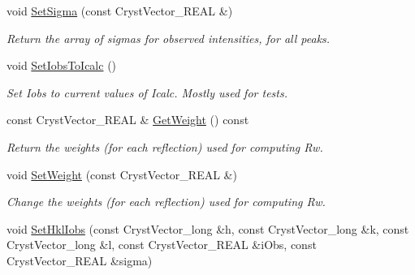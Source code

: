 \begin{DoxyCompactItemize}
void \mbox{\hyperlink{class_obj_cryst_1_1_diffraction_data_single_crystal_afec714c8df5dc6a7cf68858dbf70742b}{Set\+Sigma}} (const Cryst\+Vector\+\_\+\+R\+E\+AL \&)
\begin{DoxyCompactList}\small\item\em Return the array of sigmas for observed intensities, for all peaks. \end{DoxyCompactList}\item 
\mbox{\label{class_obj_cryst_1_1_diffraction_data_single_crystal_aa741c9f638e305ca800cf4ce0e31a615}} 
void \mbox{\hyperlink{class_obj_cryst_1_1_diffraction_data_single_crystal_aa741c9f638e305ca800cf4ce0e31a615}{Set\+Iobs\+To\+Icalc}} ()
\begin{DoxyCompactList}\small\item\em Set Iobs to current values of Icalc. Mostly used for tests. \end{DoxyCompactList}\item 
\mbox{\label{class_obj_cryst_1_1_diffraction_data_single_crystal_af3f73a3dc330c2a0c1829f2ecab1a20f}} 
const Cryst\+Vector\+\_\+\+R\+E\+AL \& \mbox{\hyperlink{class_obj_cryst_1_1_diffraction_data_single_crystal_af3f73a3dc330c2a0c1829f2ecab1a20f}{Get\+Weight}} () const
\begin{DoxyCompactList}\small\item\em Return the weights (for each reflection) used for computing Rw. \end{DoxyCompactList}\item 
\mbox{\label{class_obj_cryst_1_1_diffraction_data_single_crystal_ad30750b0b14e9b01427c311af560705c}} 
void \mbox{\hyperlink{class_obj_cryst_1_1_diffraction_data_single_crystal_ad30750b0b14e9b01427c311af560705c}{Set\+Weight}} (const Cryst\+Vector\+\_\+\+R\+E\+AL \&)
\begin{DoxyCompactList}\small\item\em Change the weights (for each reflection) used for computing Rw. \end{DoxyCompactList}\item 
void \mbox{\hyperlink{class_obj_cryst_1_1_diffraction_data_single_crystal_a0d13ab934c60c9bd0aebbb285a92c5cb}{Set\+Hkl\+Iobs}} (const Cryst\+Vector\+\_\+long \&h, const Cryst\+Vector\+\_\+long \&k, const Cryst\+Vector\+\_\+long \&l, const Cryst\+Vector\+\_\+\+R\+E\+AL \&i\+Obs, const Cryst\+Vector\+\_\+\+R\+E\+AL \&sigma)

\end{DoxyCompactItemize}
